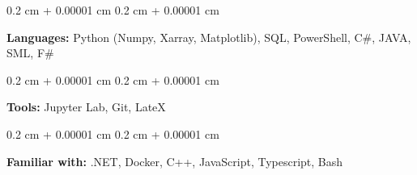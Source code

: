 \documentclass[10pt, a4paper]{article}
\newenvironment{onecolentry}{
    \begin{adjustwidth}{
        0.2 cm + 0.00001 cm
    }{
        0.2 cm + 0.00001 cm
    }
}{
    \end{adjustwidth}
} %
\begin{document}
        
        \begin{onecolentry}
            \textbf{Languages:} Python (Numpy, Xarray, Matplotlib), SQL, PowerShell, C\#, JAVA, SML, F\#
        \end{onecolentry}

        \vspace{0.4 cm}

        \begin{onecolentry}
            \textbf{Tools:} Jupyter Lab, Git, LateX
        \end{onecolentry}

        \vspace{0.4 cm}

        \begin{onecolentry}
            \textbf{Familiar with:} .NET, Docker, C++, JavaScript, Typescript, Bash
        \end{onecolentry}


    
\end{document}
